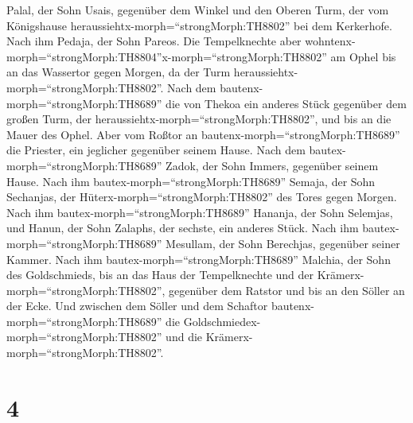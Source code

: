  Palal, der Sohn Usais, gegenüber dem Winkel und den Oberen
Turm, der vom Königshause heraussiehtx-morph=``strongMorph:TH8802'' bei
dem Kerkerhofe. Nach ihm Pedaja, der Sohn Pareos.  Die
Tempelknechte aber
wohntenx-morph=``strongMorph:TH8804''x-morph=``strongMorph:TH8802'' am
Ophel bis an das Wassertor gegen Morgen, da der Turm
heraussiehtx-morph=``strongMorph:TH8802''.  Nach dem
bautenx-morph=``strongMorph:TH8689'' die von Thekoa ein anderes Stück
gegenüber dem großen Turm, der
heraussiehtx-morph=``strongMorph:TH8802'', und bis an die Mauer des
Ophel.  Aber vom Roßtor an
bautenx-morph=``strongMorph:TH8689'' die Priester, ein jeglicher
gegenüber seinem Hause.  Nach dem
bautex-morph=``strongMorph:TH8689'' Zadok, der Sohn Immers, gegenüber
seinem Hause. Nach ihm bautex-morph=``strongMorph:TH8689'' Semaja, der
Sohn Sechanjas, der Hüterx-morph=``strongMorph:TH8802'' des Tores gegen
Morgen.  Nach ihm bautex-morph=``strongMorph:TH8689''
Hananja, der Sohn Selemjas, und Hanun, der Sohn Zalaphs, der sechste,
ein anderes Stück. Nach ihm bautex-morph=``strongMorph:TH8689''
Mesullam, der Sohn Berechjas, gegenüber seiner Kammer. 
Nach ihm bautex-morph=``strongMorph:TH8689'' Malchia, der Sohn des
Goldschmieds, bis an das Haus der Tempelknechte und der
Krämerx-morph=``strongMorph:TH8802'', gegenüber dem Ratstor und bis an
den Söller an der Ecke.  Und zwischen dem Söller und dem
Schaftor bautenx-morph=``strongMorph:TH8689'' die
Goldschmiedex-morph=``strongMorph:TH8802'' und die
Krämerx-morph=``strongMorph:TH8802''.

\hypertarget{section-3}{%
\section{4}\label{section-3}}

